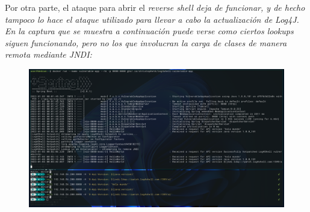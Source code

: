 \documentclass[../main.tex]{subfiles}
\begin{document}
Por otra parte, el ataque para abrir el \it{reverse shell} deja de funcionar, y de hecho tampoco lo hace el ataque utilizado para llevar a cabo la actualización de \it{Log4J}. En la captura que se muestra a continuación puede verse como ciertos \it{lookups} siguen funcionando, pero no los que involucran la carga de clases de manera remota mediante \it{JNDI}:
\begin{figure}[H]
\centering
\includegraphics[width=15.0cm]{imagenes/5-Mitigation/log4j-lookup_before-after-patching.png}
\end{figure}
\end{document}
